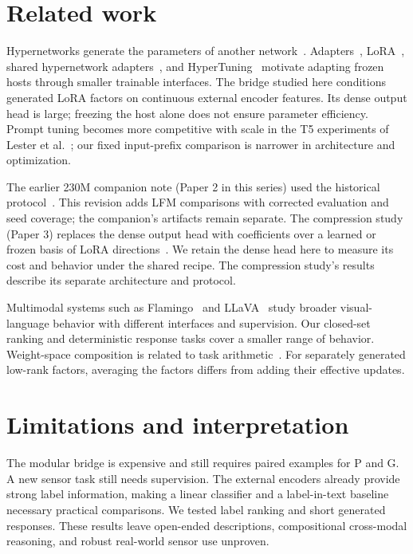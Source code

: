\documentclass[11pt]{article}
\begin{document}
\section{Related work}
Hypernetworks generate the parameters of another network~\cite{ha2016hypernetworks}.
Adapters~\cite{houlsby2019adapters}, LoRA~\cite{hu2021lora}, shared
hypernetwork adapters~\cite{mahabadi2021hyperformer}, and
HyperTuning~\cite{phang2022hypertuning} motivate adapting frozen hosts through
smaller trainable interfaces. The bridge studied here conditions generated
LoRA factors on continuous external encoder features. Its dense output head
is large; freezing the host alone does not ensure parameter efficiency.
Prompt tuning becomes more competitive with scale in the T5
experiments of Lester et al.~\cite{lester2021power}; our fixed input-prefix
comparison is narrower in architecture and optimization.

The earlier 230M companion note (Paper 2 in this series) used the historical
protocol~\cite{penov2026bridges230m}. This revision adds LFM comparisons
with corrected evaluation and seed coverage; the companion's artifacts remain
separate. The compression study (Paper 3) replaces the dense output head with
coefficients over a learned or frozen basis of LoRA
directions~\cite{penov2026compressed}. We retain the dense head here to measure
its cost and behavior under the shared recipe. The compression study's results
describe its separate architecture and protocol.

Multimodal systems such as Flamingo~\cite{alayrac2022flamingo} and
LLaVA~\cite{liu2023llava} study broader visual-language behavior with different
interfaces and supervision. Our closed-set ranking and deterministic response
tasks cover a smaller range of behavior. Weight-space composition is related
to task arithmetic~\cite{ilharco2023task}. For separately generated low-rank
factors, averaging the factors differs from adding their effective updates.

\section{Limitations and interpretation}
The modular bridge is expensive and still requires paired examples for P and G.
A new sensor task still needs supervision. The external encoders already
provide strong label information, making a linear classifier and a label-in-text
baseline necessary practical comparisons. We tested label ranking and short
generated responses. These results leave open-ended descriptions, compositional
cross-modal reasoning, and robust real-world sensor use unproven.
\end{document}
